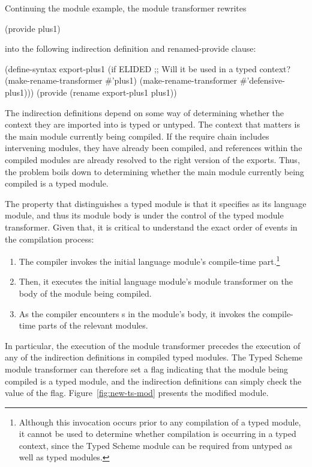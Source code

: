 \begin{schemeregion}
Continuing the  module example, the module transformer
rewrites
\begin{schemedisplay}
(provide plus1)
\end{schemedisplay}
into the following indirection definition and renamed-provide clause:
\begin{schemedisplay}
(define-syntax export-plus1
  (if ELIDED ;; Will it be used in a typed context?
      (make-rename-transformer #'plus1)
      (make-rename-transformer #'defensive-plus1)))
(provide (rename export-plus1 plus1))
\end{schemedisplay}
The indirection definitions depend on some way of determining whether
the context they are imported into is typed or untyped. The context
that matters is the main module currently being compiled. If the require
chain includes intervening modules, they have already been compiled,
and references within the compiled modules are already resolved to the
right version of the exports. Thus, the problem boils down to
determining whether the main module currently being compiled is a typed
module.

The property that distinguishes a typed module is that it specifies
 as its language module, and thus its module body
is under the control of the typed module transformer. Given that, it
is critical to understand the exact order of events in the compilation
process:
\begin{enumerate}
\item
The compiler invokes the initial language module's compile-time
 part.\footnote{Although this invocation occurs prior to any
   compilation of a typed module, it cannot be used to determine
   whether compilation is occurring in a typed context, since the
   Typed Scheme module can be required from untyped as well as typed
   modules. }
\item
Then, it executes the initial language module's module transformer on
the body of the module being compiled.
\item
As the compiler encounters s in the module's body, it
invokes the compile-time parts of the relevant modules.
\end{enumerate}
In particular, the execution of the module transformer precedes the
execution of any of the indirection definitions in compiled typed
modules. The Typed Scheme module transformer can therefore set a flag
indicating that the module being compiled is a typed module, and the
indirection definitions can simply check the value of the flag.
%
Figure~\ref{fig:new-ts-mod} presents the modified  module.



\end{schemeregion}
